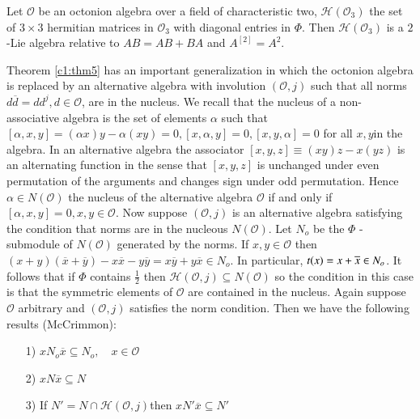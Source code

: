 \begin{coro*}
Let $\mathcal{O}$ be an octonion algebra over a field of
characteristic two, $\mathscr{H}(\mathcal{O}_3)$ the set of $3\times
3$ hermitian matrices in $\mathcal{O}_3$ with diagonal entries in
$\Phi$. Then $\mathscr{H}(\mathcal{O}_3)$ is a $2$-Lie algebra
relative to $AB=AB+BA$ and $A^{[2]}=A^{2}$.

Theorem \ref{c1:thm5} has an important generalization in which the octonion
algebra is replaced by an alternative algebra with involution
$(\mathcal{O}, j)$ such that all norms $d\overline{d}=dd^{j},d\in
\mathcal{O}$, are in the nucleus. We recall that the nucleus of  a
non-associative algebra is the set of elements $\alpha$ such that
$[\alpha, x,y]=(\alpha x)y-\alpha(xy)=0,[x,\alpha,y]=0,[x,y,\alpha]=0$
for all $x,y$\pageoriginale in the algebra. In an alternative algebra
the associator $[x,y,z]\equiv (xy)z-x(yz)$ is an alternating function
in the sense that $[x,y,z]$ is unchanged under even permutation of the
arguments and changes sign under odd permutation. Hence $\alpha
\in N(\mathcal{O})$ the nucleus of the alternative algebra
$\mathcal{O}$ if and only if $[\alpha,x,y]=0,x,y\in
\mathcal{O}$. Now suppose $(\mathcal{O}, j)$ is an alternative algebra
satisfying the condition that norms are in the nucleous
$N(\mathcal{O})$. Let $N_o$ be the $\Phi$ -submodule of
$N(\mathcal{O})$ generated by the norms. If $x,y\in \mathcal{O}$
then
$(x+y)(\overline{x}+\overline{y})-x\overline{x}-y\overline{y}=x\overline{y}+y\overline{x}\in
N_o$. In particular, $t(x) = x+ \overline{x} \in N_o$.
It follows that if $\Phi$ contains $\frac{1}{2}$ then
$\mathscr{H}(\mathcal{O}, j)\subseteq N(\mathcal{O})$ so the
condition in this case is that the symmetric elements of $\mathcal{O}$
are contained in the nucleus. Again suppose $\mathcal{O}$ arbitrary
and $(\mathcal{O},j)$ satisfies the norm condition. Then we have the
following results (McCrimmon):
\begin{itemize}
\item[1)] $xN_o\overline{x}\subseteq N_o,\quad x\in \mathcal{O}$

\item[2)] $xN\overline{x} \subseteq N$

\item[3)] If $N'=N\cap\mathscr{H}(\mathcal{O},j)$then
  $xN'\overline{x}\subseteq N'$
\end{itemize}
\end{coro*}

